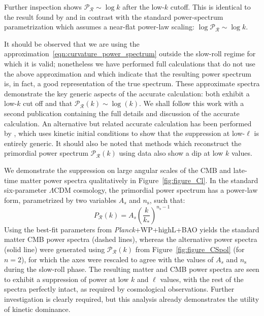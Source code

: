 Further inspection shows $\mathcal{P}_\mathcal{R} \sim \log k$ after the low-$k$ cutoff. This is identical to the result found by \citet{lasenby_closed_2003} and in contrast with the standard power-spectrum parametrization which assumes a near-flat power-law scaling: $\log\mathcal{P}_\mathcal{R}\sim \log k$. 

 
It should be observed that we are using the approximation~\eqref{eqn:curvature_power_spectrum} outside the slow-roll regime for which it is valid; nonetheless we have performed full calculations that do not use the above approximation and which indicate that the resulting power spectrum is, in fact, a good representation of the true spectrum. These approximate spectra demonstrate the key generic aspects of the accurate calculation: both exhibit a low-$k$ cut off and that $\mathcal{P}_\mathcal{R}(k) \sim \log(k)$.  We shall follow this work with a second publication containing the full details and discussion of the accurate calculation. An alternative but related accurate calculation has been performed by \citep{Lello_tensor_2013}, which uses kinetic initial conditions to show that the suppression at low-$\ell$ is entirely generic. It should also be noted that methods which reconstruct the primordial power spectrum $\mathcal{P}_\mathcal{R}(k)$ \citep{vazquez_reconstruction,Hazra_reconstruction_2013} using data also show a dip at low $k$ values.

We demonstrate the suppression on large angular scales of the CMB and late-time matter power spectra qualitatively in Figure~\ref{fig:figure_Cl}.  In the standard six-parameter $\Lambda$CDM cosmology, the primordial power spectrum has a power-law form, parametrized by two variables $A_s$ and $n_\mathrm{s}$, such that:
%
\begin{equation}
  P_\mathcal{R}(k) = A_s{\left(\frac{k}{k_*}\right)}^{n_\mathrm{s}-1}
\end{equation}
%
Using the best-fit parameters from {\em Planck\/}+WP+highL+BAO \citep{planck_collaboration_planck_2013} yields the standard matter CMB power spectra (dashed lines), whereas the alternative power spectra (solid line) were generated using $\mathcal{P}_\mathcal{R}(k)$ from Figure~\ref{fig:figure_CSpol} (for $n=2$), for which the axes were rescaled to agree with the values of $A_s$ and $n_\mathrm{s}$ during the slow-roll phase. The resulting matter and CMB power spectra are seen to exhibit a suppression of power at low $k$ and $\ell$ values, with the rest of the spectra perfectly intact, as required by cosmological observations.  Further investigation is clearly required, but this analysis already demonstrates the utility of kinetic dominance.

